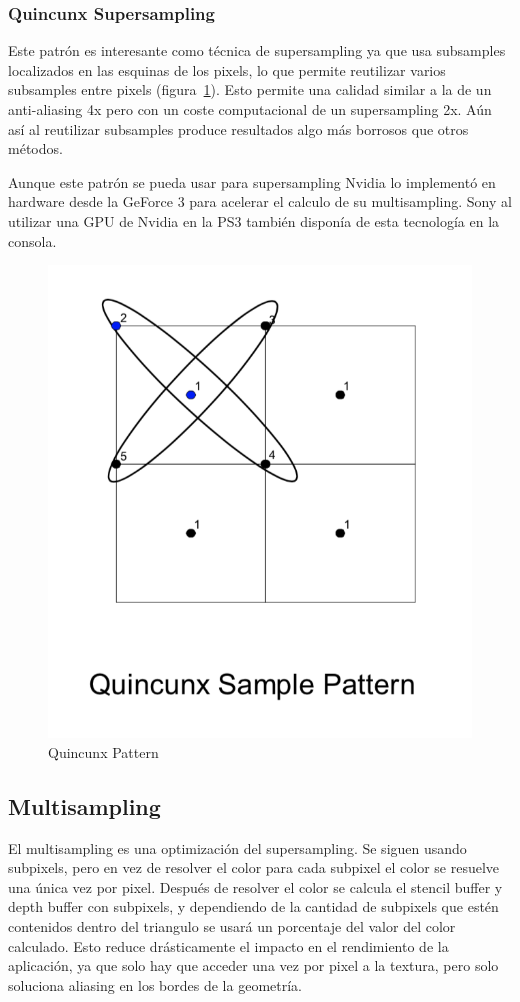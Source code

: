 \documentclass[withindex, glossary]{cam-thesis}
\begin{document}
\subsubsection{Quincunx Supersampling}

Este patrón es interesante como técnica de supersampling ya que usa subsamples localizados en las esquinas de los pixels, lo que permite reutilizar varios subsamples entre pixels (figura~\ref{fig:quincunx}). Esto permite una calidad similar a la de un anti-aliasing 4x pero con un coste computacional de un supersampling 2x. Aún así al reutilizar subsamples produce resultados algo más borrosos que otros métodos.

Aunque este patrón se pueda usar para supersampling Nvidia lo implementó en hardware desde la GeForce 3\cite{hraa} para acelerar el calculo de su multisampling. Sony al utilizar una GPU de Nvidia en la PS3 también disponía de esta tecnología en la consola.

\begin{figure}[!htbp]
    \includegraphics[width=.5\linewidth]{figures/quincunx.png}
    \caption{Quincunx Pattern\cite{hraa}}
    \label{fig:quincunx}
\end{figure}

\subsection{Multisampling}

El multisampling es una optimización del supersampling. Se siguen usando subpixels, pero en vez de resolver el color para cada subpixel el color se resuelve una única vez por pixel. Después de resolver el color se calcula el stencil buffer y depth buffer con subpixels, y dependiendo de la cantidad de subpixels que estén contenidos dentro del triangulo se usará un porcentaje del valor del color calculado. Esto reduce drásticamente el impacto en el rendimiento de la aplicación, ya que solo hay que acceder una vez por pixel a la textura, pero solo soluciona aliasing en los bordes de la geometría\cite{nvidiamsaa}\cite{msaa}.
\end{document}
